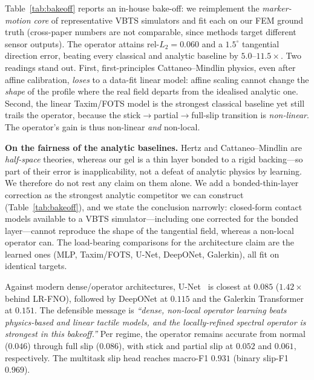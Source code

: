 \documentclass[conference]{IEEEtran}
\newcommand{\relL}{\mathrm{rel}\text{-}L_2}
\newcommand{\lrfnoErr}{0.060}       \newcommand{\lrfnoDir}{1.5}
\newcommand{\unetErr}{0.085}        \newcommand{\unetDir}{2.2}  \newcommand{\unetAdv}{1.42}
\newcommand{\deeponetErr}{0.115}    \newcommand{\deeponetDir}{3.2} \newcommand{\deeponetAdv}{1.91}
\newcommand{\galerkinErr}{0.151}    \newcommand{\galerkinDir}{4.1} \newcommand{\galerkinAdv}{2.52}
\newcommand{\baselineSpanLo}{5.0}   \newcommand{\baselineSpanHi}{11.5}
\newcommand{\errNormal}{0.046}  \newcommand{\errStick}{0.052}
\newcommand{\errPartial}{0.061} \newcommand{\errFull}{0.086}
\newcommand{\slipMacroF}{0.931} \newcommand{\slipBinF}{0.969}
\begin{document}
Table~\ref{tab:bakeoff} reports an in-house bake-off: we reimplement the
\emph{marker-motion core} of representative VBTS simulators and fit each on our FEM
ground truth (cross-paper numbers are not comparable, since methods target
different sensor outputs). The operator attains $\relL=\lrfnoErr$ and a
$\lrfnoDir^\circ$ tangential direction error, beating every classical and analytic
baseline by $\baselineSpanLo$--$\baselineSpanHi\times$. Two readings stand out.
First, first-principles
Cattaneo--Mindlin physics, even after affine calibration, \emph{loses} to a
data-fit linear model: affine scaling cannot change the \emph{shape} of the profile
where the real field departs from the idealised analytic one. Second, the
linear Taxim/FOTS model is the strongest classical baseline yet still trails the
operator, because the stick$\to$partial$\to$full-slip transition is
\emph{non-linear}. The operator's gain is thus non-linear \emph{and} non-local.

\textbf{On the fairness of the analytic baselines.} Hertz and Cattaneo--Mindlin are
\emph{half-space} theories, whereas our gel is a thin layer bonded to a rigid
backing---so part of their error is inapplicability, not a defeat of analytic
physics by learning. We therefore do not rest any claim on them alone. We add a
bonded-thin-layer correction as the strongest analytic competitor we can construct
(Table~\ref{tab:bakeoff}), and we state the conclusion narrowly: closed-form
contact models available to a VBTS simulator---including one corrected for the
bonded layer---cannot reproduce the shape of the tangential field, whereas a
non-local operator can. The load-bearing comparisons for the architecture claim are
the learned ones (MLP, Taxim/FOTS, U-Net, DeepONet, Galerkin), all fit on identical
targets.

Against modern dense/operator architectures, U-Net~\cite{ronneberger2015unet} is
closest at $\unetErr$ ($\unetAdv\times$ behind LR-FNO), followed by DeepONet at
$\deeponetErr$ and the Galerkin Transformer at $\galerkinErr$. The defensible
message is
\emph{``dense, non-local operator learning beats physics-based and linear tactile
models, and the locally-refined spectral operator is strongest in this bakeoff.''}
Per regime, the operator remains accurate from normal ($\errNormal$) through full
slip ($\errFull$), with stick and partial slip at $\errStick$ and $\errPartial$,
respectively.
The multitask slip head reaches macro-F1 $\slipMacroF$ (binary slip-F1 $\slipBinF$).
\end{document}
